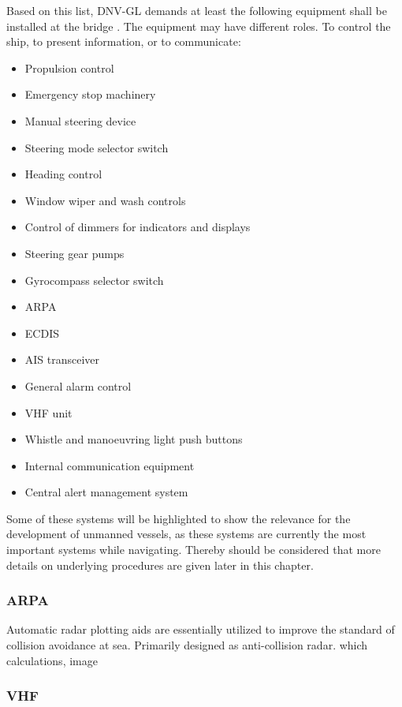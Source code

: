 Based on this list, DNV-GL demands at least the following equipment shall be installed at the bridge \cite{DNVGL2011}. The equipment may have different roles. To control the ship, to present information, or to communicate:
\begin{multicols}{2}
	\begin{itemize}
		\item Propulsion control
		\item Emergency stop machinery
		\item Manual steering device
		\item Steering mode selector switch
		\item Heading control
		\item Window wiper and wash controls
		\item Control of dimmers for indicators and displays
		\item Steering gear pumps
		\item Gyrocompass selector switch
		\item \acf{ARPA}
		\item \acf{ECDIS}
		\item \acf{AIS} transceiver
		\item General alarm control
		\item \acf{VHF} unit
		\item Whistle and manoeuvring light push buttons
		\item Internal communication equipment
		\item Central alert management system
	\end{itemize}
\end{multicols}

Some of these systems will be highlighted to show the relevance for the development of unmanned vessels, as these systems are currently the most important systems while navigating. Thereby should be considered that more details on underlying procedures are given later in this chapter. 

\subsubsection{\acf{ARPA}}
Automatic radar plotting aids are essentially utilized to improve the standard of collision avoidance at sea. Primarily designed as anti-collision radar.
which calculations,
image


\subsubsection{\acf{VHF}}

